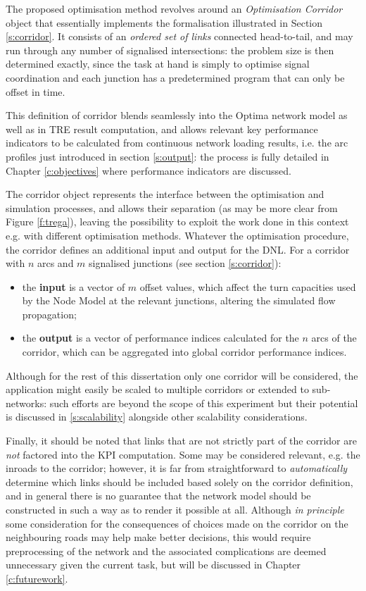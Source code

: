 The proposed optimisation method revolves around an \emph{Optimisation Corridor} object that essentially implements the formalisation illustrated in Section \ref{s:corridor}. It consists of an \emph{ordered set of links} connected head-to-tail, and may run through any number of signalised intersections: the problem size is then determined exactly, since the task at hand is simply to optimise signal coordination and each junction has a predetermined program that can only be offset in time.

This definition of corridor blends seamlessly into the Optima network model as well as in TRE result computation, and allows relevant key performance indicators to be calculated from continuous network loading results, i.e. the arc profiles just introduced in section \ref{s:output}: the process is fully detailed in Chapter \ref{c:objectives} where performance indicators are discussed.

The corridor object represents the interface between the optimisation and simulation processes, and allows their separation (as may be more clear from Figure \ref{f:trega}), leaving the possibility to exploit the work done in this context e.g. with different optimisation methods. Whatever the optimisation procedure, the corridor defines an additional input and output for the DNL. For a corridor with $n$ arcs and $m$ signalised junctions (see section \ref{s:corridor}):
\begin{itemize}
\item the \textbf{input} is a vector of $m$ offset values, which affect the turn capacities used by the Node Model at the relevant junctions, altering the simulated flow propagation;
\item the \textbf{output} is a vector of performance indices calculated for the $n$ arcs of the corridor, which can be aggregated into global corridor performance indices.
\end{itemize}

Although for the rest of this dissertation only one corridor will be considered, the application might easily be scaled to multiple corridors or extended to sub-networks: such efforts are beyond the scope of this experiment but their potential is discussed in \ref{s:scalability} alongside other scalability considerations.

Finally, it should be noted that links that are not strictly part of the corridor are \emph{not} factored into the KPI computation. Some may be considered relevant, e.g. the inroads to the corridor; however, it is far from straightforward to \emph{automatically} determine which links should be included based solely on the corridor definition, and in general there is no guarantee that the network model should be constructed in such a way as to render it possible at all. Although \emph{in principle} some consideration for the consequences of choices made on the corridor on the neighbouring roads may help make better decisions, this would require preprocessing of the network and the associated complications are deemed unnecessary given the current task, but will be discussed in Chapter \ref{c:futurework}.

